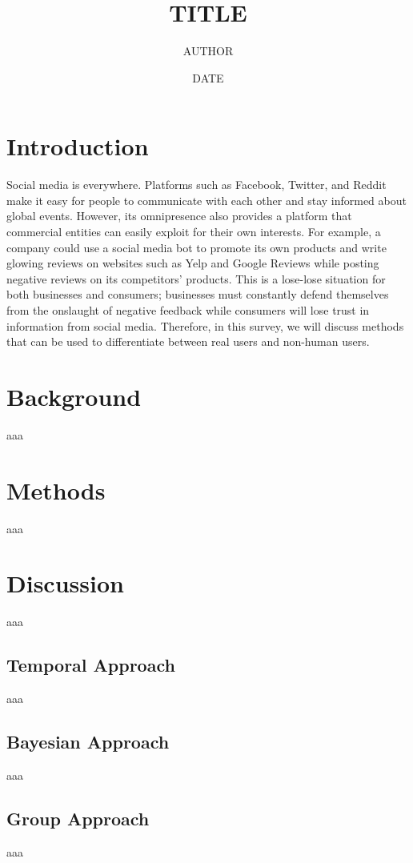 \documentclass[11pt, oneside]{article}   	%
\title{TITLE}
\author{AUTHOR}
\date{DATE}							%
\begin{document}
\maketitle

\section*{Introduction}

\quad Social media is everywhere. Platforms such as Facebook, Twitter, and Reddit make it easy for people to communicate with each other and stay informed about global events. However, its omnipresence also provides a platform that commercial entities can easily exploit for their own interests. For example, a company could use a social media bot to promote its own products and write glowing reviews on websites such as Yelp and Google Reviews while posting negative reviews on its competitors' products. This is a lose-lose situation for both businesses and consumers; businesses must constantly defend themselves from the onslaught of negative feedback while consumers will lose trust in information from social media. Therefore, in this survey, we will discuss methods that can be used to differentiate between real users and non-human users.

\section*{Background}

aaa

\section*{Methods}

aaa

\section*{Discussion}

aaa

\subsection*{Temporal Approach}

aaa

\subsection*{Bayesian Approach}

aaa

\subsection*{Group Approach}

aaa
\end{document}
